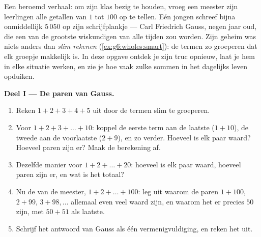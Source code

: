 \begin{problem}
\label{pb:g6:wholes:1}
Een beroemd verhaal: om zijn klas bezig te houden, vroeg een meester zijn
leerlingen alle getallen van $1$ tot $100$ op te tellen. Eén jongen schreef
bijna onmiddellijk $5\,050$ op zijn schrijfplankje --- Carl Friedrich Gauss,
negen jaar oud, die een van de grootste wiskundigen van alle tijden zou
worden. Zijn geheim was niets anders dan \emph{slim rekenen}
(\cref{ex:g6:wholes:smart}): de termen zo groeperen dat elk groepje makkelijk
is. In deze opgave ontdek je zijn truc opnieuw, laat je hem in elke situatie
werken, en zie je hoe vaak zulke sommen in het dagelijks leven opduiken.

\medskip
\noindent\textbf{Deel I --- De paren van Gauss.}
\begin{enumerate}
  \item Reken $1 + 2 + 3 + 4 + 5$ uit door de termen slim te groeperen.
  \item Voor $1 + 2 + 3 + \dots + 10$: koppel de eerste term aan de laatste
        ($1 + 10$), de tweede aan de voorlaatste ($2 + 9$), en zo verder.
        Hoeveel is elk paar waard? Hoeveel paren zijn er? Maak de berekening
        af.
  \item Dezelfde manier voor $1 + 2 + \dots + 20$: hoeveel is elk paar
        waard, hoeveel paren zijn er, en wat is het totaal?
  \item Nu de  van de meester, $1 + 2 + \dots + 100$: leg uit waarom de
        paren $1 + 100$, $2 + 99$, $3 + 98, \dots$ allemaal even veel waard
        zijn, en waarom het er precies $50$ zijn, met $50 + 51$ als laatste.
  \item Schrijf het antwoord van Gauss als één vermenigvuldiging, en reken
        het uit.
\end{enumerate}


\end{problem}
